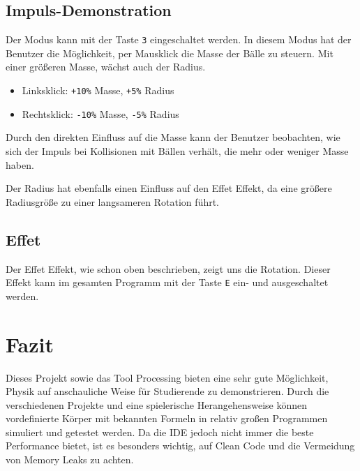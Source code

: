 \documentclass[12pt,a4paper]{article}
\begin{document}
	
	\subsection{Impuls-Demonstration}
	
	Der Modus kann mit der Taste \texttt{3} eingeschaltet werden. 
	In diesem Modus hat der Benutzer die Möglichkeit, per Mausklick die Masse der Bälle zu steuern. 
	Mit einer größeren Masse, wächst auch der Radius. 
\begin{itemize}
	\item Linksklick: \texttt{+10\%} Masse, \texttt{+5\%} Radius  
	\item Rechtsklick: \texttt{-10\%} Masse, \texttt{-5\%} Radius  
\end{itemize}

Durch den direkten Einfluss auf die Masse kann der Benutzer beobachten, wie sich der Impuls bei Kollisionen mit Bällen verhält, die mehr oder weniger Masse haben.  

Der Radius hat ebenfalls einen Einfluss auf den Effet Effekt, da eine größere Radiusgröße zu einer langsameren Rotation führt.

	
	
	\subsection{Effet}
	
	Der Effet Effekt, wie schon oben beschrieben, zeigt uns die Rotation. Dieser Effekt kann im gesamten Programm mit der Taste \texttt{E} ein- und ausgeschaltet werden.
	
	\section{Fazit}
	
Dieses Projekt sowie das Tool Processing bieten eine sehr gute Möglichkeit, Physik auf anschauliche Weise für Studierende zu demonstrieren. Durch die verschiedenen Projekte und eine spielerische Herangehensweise können vordefinierte Körper mit bekannten Formeln in relativ großen Programmen simuliert und getestet werden. Da die IDE jedoch nicht immer die beste Performance bietet, ist es besonders wichtig, auf Clean Code und die Vermeidung von Memory Leaks zu achten.
	
	
	
\end{document}
